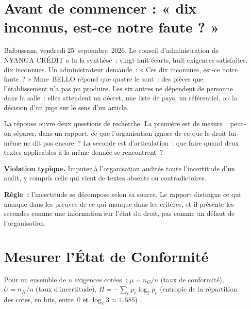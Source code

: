 \bigskip

\section*{Avant de commencer : « dix inconnus, est-ce notre faute ? »}

Bafoussam, vendredi 25~septembre~2026. Le conseil d'administration de NYANGA
CRÉDIT a lu la synthèse~: vingt-huit écarts, huit exigences satisfaites,
dix inconnues. Un administrateur demande~: « Ces dix inconnues, est-ce notre
faute~? » Mme~BELLO répond que quatre le sont~: des pièces que
l'établissement n'a pas pu produire. Les six autres ne dépendent de
personne dans la salle~: elles attendent un décret, une liste de pays, un
référentiel, ou la décision d'un juge sur le sens d'un article.

La réponse ouvre deux questions de recherche. La première est de mesure~:
peut-on séparer, dans un rapport, ce que l'organisation ignore de ce que
le droit lui-même ne dit pas encore~? La seconde est d'articulation~: que
faire quand deux textes applicables à la même donnée se rencontrent~?

\begin{boxalert}
\textbf{Violation typique.} Imputer à l'organisation auditée toute
l'incertitude d'un audit, y compris celle qui vient de textes absents ou
contradictoires.

\smallskip
\textbf{Règle~:} l'incertitude se décompose selon sa source. Le rapport
distingue ce qui manque dans les preuves de ce qui manque dans les
critères, et il présente les secondes comme une information sur l'état du
droit, pas comme un défaut de l'organisation.
\end{boxalert}

\section{Mesurer l'État de Conformité}
\label{sec:c16-mesurer}

\begin{boxdef}
Pour un ensemble de $n$ exigences cotées~: $\mu = n_O/n$ (taux de
conformité), $U = n_K/n$ (taux d'incertitude), $H = -\sum_c p_c \log_2 p_c$
(entropie de la répartition des cotes, en bits, entre~0 et
$\log_2 3 \approx 1{,}585$)~\cite{minka2026nek, shannon1948}.
\end{boxdef}

